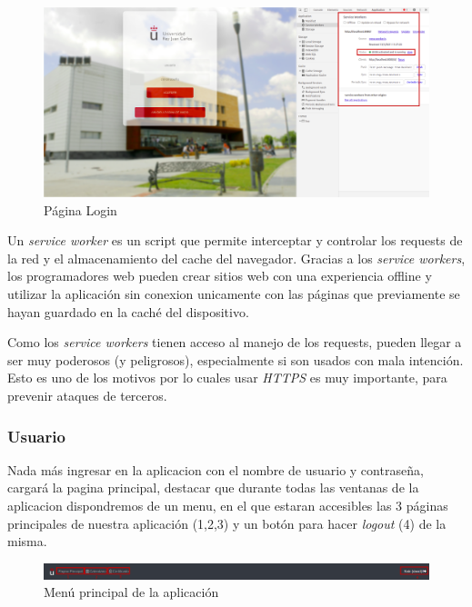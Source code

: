 \documentclass[a4paper, 12pt]{book}
\begin{document}
	\begin{figure}[H]
  	\centering
  	\includegraphics[width=16cm, keepaspectratio]{img/principalWorker.png}
  	\caption{Página Login}\label{fig:principalWorker}
	\end{figure}

	Un \emph{service worker} es un script que permite interceptar y controlar los requests de la red y el almacenamiento del cache del navegador. Gracias a los \textit{service workers}, los programadores web pueden crear sitios web con una experiencia offline y utilizar la aplicación sin conexion unicamente con las páginas que previamente se hayan guardado en la caché del dispositivo.
	
	Como los \textit{service workers} tienen acceso al manejo de los requests, pueden llegar a ser muy poderosos (y peligrosos), especialmente si son usados con mala intención. Esto es uno de los motivos por lo cuales usar \textit{HTTPS} es muy importante, para prevenir ataques de terceros.

\subsubsection{Usuario}
	Nada más ingresar en la aplicacion con el nombre de usuario y contraseña, cargará la pagina principal, destacar que durante todas las ventanas de la aplicacion dispondremos de un menu, en el que estaran accesibles las 3 páginas principales de nuestra aplicación (1,2,3) y un botón para hacer \textit{logout} (4) de la misma.
	\begin{figure}[H]
  	\centering
  	\includegraphics[width=16cm, keepaspectratio]{img/menu.png}
  	\caption{Menú principal de la aplicación}\label{fig:menu}
	\end{figure}
	
\end{document}
